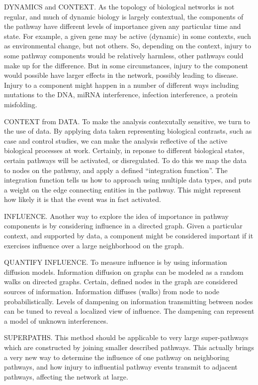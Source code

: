 \documentclass[twoside]{article}
\begin{document}
\begin{multicols}{2}
DYNAMICS and CONTEXT. As the topology of biological networks is not regular, and much of
dynamic biology is largely contextual, the components of the pathway have
different levels of importance given any particular time and
state. For example, a given gene may be active (dynamic) in some
contexts, such as environmental change, but not others.
So, depending on the context, injury to some pathway components would
be relatively harmless, other pathways could make up for the difference. But in some circumstances,
injury to the component would possible have larger effects in the
network, possibly leading to disease.
Injury to a component might happen in a number of different ways
including mutations to the DNA, miRNA interference, infection
interference, a protein misfolding.

CONTEXT from DATA. To make the analysis contexutally sensitive, we turn to the use of
data. By applying data taken representing biological contrasts, such
as case and control studies, we can make the analysis reflective of
the active biological processes at work. Certainly, in reponse to
different biological states, certain pathways will be activated, or
disregulated. To do this we map the data to nodes on the pathway, and
apply a defined ``integration function''. The integration function
tells us how to approach using multiple data types, and puts a weight
on the edge connecting entities in the pathway. This might represent
how likely it is that the event was in fact activated.

INFLUENCE. Another way to explore the idea of importance in pathway components is by
considering influence in a directed graph. Given a particular context,
and supported by data, a component
might be considered important if it exercises influence over a large neighborhood
on the graph. 

QUANTIFY INFLUENCE. To measure influence is by using information diffusion
models. Information diffusion on graphs can be modeled as a random
walks on directed graphs. Certain, defined nodes in the graph are
considered sources of information. Information diffuses (walks) from
node to node probabilistically. Levels of dampening on information transmitting between nodes
can be tuned to reveal a localized view of influence. The dampening
can represent a model of unknown interferences. 

SUPERPATHS. This method should be applicable to very large super-pathways which
are constructed by joining smaller described pathways. This actually
brings a very new way to determine the influence of one pathway on
neighboring pathways, and how injury to influential pathway events
transmit to adjacent pathways, affecting the network at large.


\end{multicols}
\end{document}
